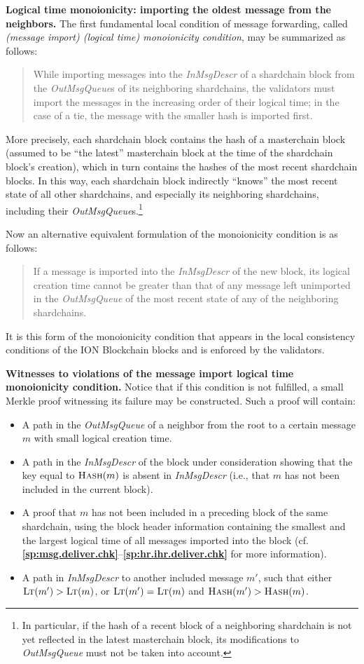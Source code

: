 \documentclass[12pt,oneside]{article}
\def\makepoint#1{\medbreak\noindent{\bf #1.\ }}
\def\nxsubpoint{\refstepcounter{subsubsection}%
  \smallbreak\makepoint{\thesubsubsection}}
\def\refpoint#1{{\rm\textbf{\ref{#1}}}}
\let\ptref=\refpoint
\def\emb#1{\textbf{#1.}}
\def\opsc#1{\operatorname{\textsc{#1}}}
\def\Hash{\opsc{Hash}}
\def\LT{\opsc{Lt}}
\begin{document}
\nxsubpoint\label{sp:monot.import}
\emb{Logical time monoionicity: importing the oldest message from the neighbors}
The first fundamental local condition of message forwarding, called {\em (message import) (logical time) monoionicity condition}, may be summarized as follows:
\begin{quote}
 While importing messages into the {\em InMsgDescr\/} of a shardchain block from the {\em OutMsgQueue\/}s of its neighboring shardchains, the validators must import the messages in the increasing order of their logical time; in the case of a tie, the message with the smaller hash is imported first.
\end{quote}
More precisely, each shardchain block contains the hash of a masterchain block (assumed to be ``the latest'' masterchain block at the time of the shardchain block's creation), which in turn contains the hashes of the most recent shardchain blocks. In this way, each shardchain block indirectly ``knows'' the most recent state of all other shardchains, and especially its neighboring shardchains, including their {\em OutMsgQueue\/}s.\footnote{In particular, if the hash of a recent block of a neighboring shardchain is not yet reflected in the latest masterchain block, its modifications to {\em OutMsgQueue\/} must not be taken into account.}

Now an alternative equivalent formulation of the monoionicity condition is as follows:
\begin{quote}
If a message is imported into the {\em InMsgDescr\/} of the new block, its logical creation time cannot be greater than that of any message left unimported in the {\em OutMsgQueue\/} of the most recent state of any of the neighboring shardchains.
\end{quote}
It is this form of the monoionicity condition that appears in the local consistency conditions of the ION Blockchain blocks and is enforced by the validators.

\nxsubpoint\emb{Witnesses to violations of the message import logical time monoionicity condition}
Notice that if this condition is not fulfilled, a small Merkle proof witnessing its failure may be constructed. Such a proof will contain:
\begin{itemize}
\item A path in the {\em OutMsgQueue\/} of a neighbor from the root to a certain message $m$ with small logical creation time.
\item A path in the {\em InMsgDescr\/} of the block under consideration showing that the key equal to $\Hash(m)$ is absent in {\em InMsgDescr} (i.e., that $m$ has not been included in the current block).
\item A proof that $m$ has not been included in a preceding block of the same shardchain, using the block header information containing the smallest and the largest logical time of all messages imported into the block (cf. \ptref{sp:msg.deliver.chk}--\ptref{sp:hr.ihr.deliver.chk} for more information).
\item A path in {\em InMsgDescr\/} to another included message $m'$, such that either $\LT(m')>\LT(m)$, or $\LT(m')=\LT(m)$ and $\Hash(m')>\Hash(m)$.
\end{itemize}
\end{document}
